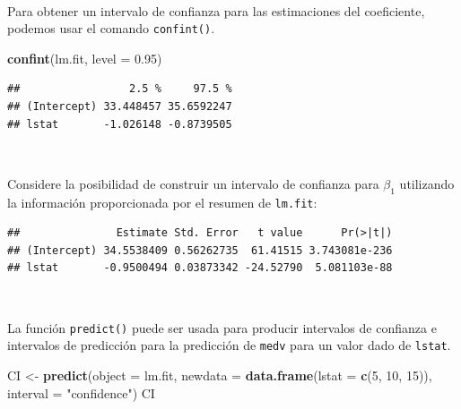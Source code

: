 \documentclass[]{book}
\newenvironment{Shaded}{\begin{snugshade}}{\end{snugshade}}
\newcommand{\KeywordTok}[1]{\textcolor[rgb]{0.13,0.29,0.53}{\textbf{#1}}}
\newcommand{\DataTypeTok}[1]{\textcolor[rgb]{0.13,0.29,0.53}{#1}}
\newcommand{\DecValTok}[1]{\textcolor[rgb]{0.00,0.00,0.81}{#1}}
\newcommand{\FloatTok}[1]{\textcolor[rgb]{0.00,0.00,0.81}{#1}}
\newcommand{\StringTok}[1]{\textcolor[rgb]{0.31,0.60,0.02}{#1}}
\newcommand{\OperatorTok}[1]{\textcolor[rgb]{0.81,0.36,0.00}{\textbf{#1}}}
\newcommand{\NormalTok}[1]{#1}
\begin{document}
~

Para obtener un intervalo de confianza para las estimaciones del
coeficiente, podemos usar el comando \texttt{confint()}.

\begin{Shaded}
\begin{Highlighting}[]
\KeywordTok{confint}\NormalTok{(lm.fit, }\DataTypeTok{level =} \FloatTok{0.95}\NormalTok{)}
\end{Highlighting}
\end{Shaded}

\begin{verbatim}
##                 2.5 %     97.5 %
## (Intercept) 33.448457 35.6592247
## lstat       -1.026148 -0.8739505
\end{verbatim}

~

Considere la posibilidad de construir un intervalo de confianza para
\(\beta_1\) utilizando la información proporcionada por el resumen de
\texttt{lm.fit}:

\begin{Shaded}
\end{Shaded}

\begin{verbatim}
##               Estimate Std. Error   t value      Pr(>|t|)
## (Intercept) 34.5538409 0.56262735  61.41515 3.743081e-236
## lstat       -0.9500494 0.03873342 -24.52790  5.081103e-88
\end{verbatim}

~

La función \texttt{predict()} puede ser usada para producir intervalos
de confianza e intervalos de predicción para la predicción de
\texttt{medv} para un valor dado de \texttt{lstat}.

\begin{Shaded}
\begin{Highlighting}[]
\NormalTok{CI <-}\StringTok{ }\KeywordTok{predict}\NormalTok{(}\DataTypeTok{object =}\NormalTok{ lm.fit, }\DataTypeTok{newdata =} \KeywordTok{data.frame}\NormalTok{(}\DataTypeTok{lstat =} \KeywordTok{c}\NormalTok{(}\DecValTok{5}\NormalTok{, }\DecValTok{10}\NormalTok{, }\DecValTok{15}\NormalTok{)), }
              \DataTypeTok{interval =} \StringTok{"confidence"}\NormalTok{)}
\NormalTok{CI}
\end{Highlighting}
\end{Shaded}
\end{document}
